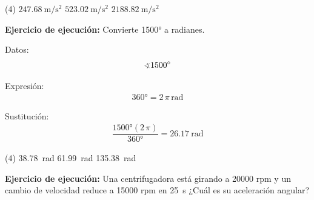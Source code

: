 \documentclass[12pt, letter]{exam}
\begin{document}
\begin{questions}
    \vspace{0.3cm}
    \begin{tasks}(4)
        \task $\displaystyle \SI[per-mode=fraction]{247.68}{\meter\per\square\second}$
        \task $\displaystyle \SI[per-mode=fraction]{523.02}{\meter\per\square\second}$
        \task {}
        \task $\displaystyle \SI[per-mode=fraction]{2188.82}{\meter\per\square\second}$
    \end{tasks}

    \question \textbf{Ejercicio de ejecución: } Convierte \ang{1500} a radianes.
    
     
    \begin{minipage}[t]{0.35\linewidth}
    Datos: 
    \begin{align*}
    \varangle{\ang{1500}}
    \end{align*}
    \end{minipage}
    \hspace{1cm}
    \begin{minipage}[t]{0.4\linewidth}
    Expresión:
    \begin{align*}
    \ang{360} = 2 \, \pi \, \unit{\radian}
    \end{align*}
    \end{minipage}

    Sustitución:
    \begin{align*}
    \dfrac{ \ang{1500} (2 \, \pi)}{\ang{360}} = \SI{26.17}{\radian}
    \end{align*}

    \vspace{0.3cm}
    
    \begin{tasks}(4)
        \task {}
        \task \SI{38.78}{\radian}
        \task \SI{61.99}{\radian}
        \task \SI{135.38}{\radian}
    \end{tasks}

    \question \label{Ejercicio_03} \textbf{Ejercicio de ejecución: } Una centrifugadora está girando a 20000 rpm y un cambio de velocidad reduce a 15000 rpm en \SI{25}{\second} ¿Cuál es su aceleración angular?


\end{questions}
\end{document}
